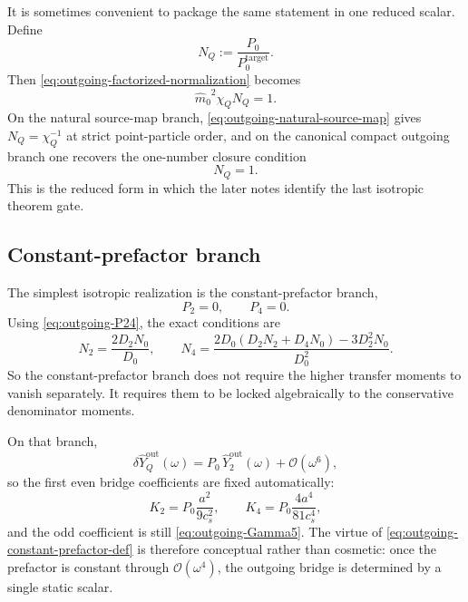 \documentclass[11pt]{article}
\theoremstyle{definition}
\newcommand{\out}{\mathrm{out}}
\newcommand{\mhat}{\ensuremath{\hat m_0}}
\newcommand{\Yout}{\ensuremath{\widehat Y_2^{\out}}}
\newcommand{\cO}{\mathcal O}
\begin{document}
It is sometimes convenient to package the same statement in one reduced scalar. Define
\begin{equation}
N_Q:=\frac{P_0}{P_0^{\mathrm{target}}}.
\label{eq:outgoing-NQ-def}
\end{equation}
Then \eqref{eq:outgoing-factorized-normalization} becomes
\begin{equation}
\mhat^{2}\chi_Q N_Q=1.
\label{eq:outgoing-NQ-factorized}
\end{equation}
On the natural source-map branch, \eqref{eq:outgoing-natural-source-map} gives $N_Q=\chi_Q^{-1}$ at strict point-particle order, and on the canonical compact outgoing branch one recovers the one-number closure condition
\begin{equation}
N_Q=1.
\label{eq:outgoing-NQ-canonical}
\end{equation}
This is the reduced form in which the later notes identify the last isotropic theorem gate.

\subsection{Constant-prefactor branch}

The simplest isotropic realization is the constant-prefactor branch,
\begin{equation}
P_2=0,
\qquad
P_4=0.
\label{eq:outgoing-constant-prefactor-def}
\end{equation}
Using \eqref{eq:outgoing-P24}, the exact conditions are
\begin{equation}
N_2=\frac{2D_2N_0}{D_0},
\qquad
N_4=\frac{2D_0(D_2N_2+D_4N_0)-3D_2^2N_0}{D_0^2}.
\label{eq:outgoing-constant-prefactor-conditions}
\end{equation}
So the constant-prefactor branch does not require the higher transfer moments to vanish separately. It requires them to be locked algebraically to the conservative denominator moments.

On that branch,
\begin{equation}
\delta\widehat Y_Q^{\out}(\omega)=P_0\,\Yout(\omega)+\cO(\omega^6),
\label{eq:outgoing-constant-prefactor-product}
\end{equation}
so the first even bridge coefficients are fixed automatically:
\begin{equation}
K_2=P_0\frac{a^2}{9c_s^2},
\qquad
K_4=P_0\frac{4a^4}{81c_s^4},
\label{eq:outgoing-constant-prefactor-even}
\end{equation}
and the odd coefficient is still \eqref{eq:outgoing-Gamma5}. The virtue of \eqref{eq:outgoing-constant-prefactor-def} is therefore conceptual rather than cosmetic: once the prefactor is constant through $\cO(\omega^4)$, the outgoing bridge is determined by a single static scalar.
\end{document}
